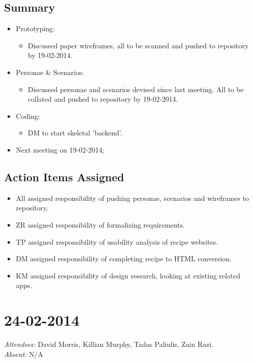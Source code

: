 \documentclass{article}
\begin{document}
\subsection*{Summary}
\begin{itemize}
\item Prototyping:
  \begin{itemize}
  \item Discussed paper wireframes, all to be scanned and pushed to repository by 19-02-2014.
  \end{itemize}
\item Personae \& Scenarios:
  \begin{itemize}
  \item Discussed personae and scenarios devised since last meeting. All to be collated and pushed to repository by 19-02-2014.
  \end{itemize}
\item Coding:
  \begin{itemize}
  \item DM to start skeletal 'backend'.
  \end{itemize}
\item Next meeting on 19-02-2014;
\end{itemize}

\subsection*{Action Items Assigned}
\begin{itemize}
\item All assigned responsibility of pushing personae, scenarios and wireframes to repository.
\item ZR assigned responsibility of formalizing requirements.
\item TP assigned responsibility of usability analysis of recipe websites.
\item DM assigned responsibility of completing recipe to HTML conversion.
\item KM assigned responsibility of design research, looking at existing related apps.
\end{itemize}



\clearpage

\section*{24-02-2014}
\vspace{0.5cm}
\emph{Attendees: }David Morris, Killian Murphy, Tadas Paliulis, Zain Razi.
\\
\emph{Absent: }N/A
\end{document}

